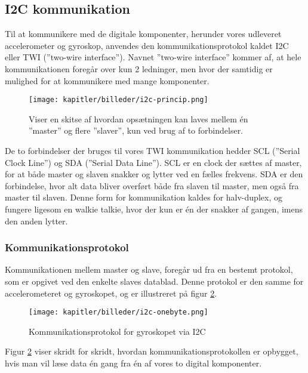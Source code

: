 \newpage
\subsection{I2C kommunikation}
Til at kommunikere med de digitale komponenter, herunder vores udleveret accelerometer og gyroskop, anvendes den kommunikationsprotokol kaldet I2C eller TWI (”two-wire interface”). Navnet ”two-wire interface” kommer af, at hele kommunikationen foregår over kun 2 ledninger, men hvor der samtidig er mulighed for at kommunikere med mange komponenter.

\begin{figure}[ht]
    \centering
    \texttt{[image: kapitler/billeder/i2c-princip.png]}
    \caption{Viser en skitse af hvordan opsætningen kan laves mellem
én ”master” og flere ”slaver”, kun ved brug af to forbindelser.}
    \label{fig:i2cprincip}
\end{figure}

De to forbindelser der bruges til vores TWI kommunikation hedder SCL (”Serial Clock Line”) og SDA (”Serial Data Line”). SCL er en clock der sættes af master, for at både master og slaven snakker og lytter ved en fælles frekvens. SDA er den forbindelse, hvor alt data bliver overført både fra slaven til master, men også fra master til slaven. Denne form for kommunikation kaldes for halv-duplex, og fungere ligesom en walkie talkie, hvor der kun er én der snakker af gangen, imens den anden lytter.

\subsubsection{Kommunikationsprotokol}

Kommunikationen mellem master og slave, foregår ud fra en bestemt protokol, som er opgivet ved den enkelte slaves datablad. Denne protokol er den samme for accelerometeret og gyroskopet, og er illustreret på figur \ref{fig:i2conebyte}. 

\begin{figure}[ht]
    \centering
    \texttt{[image: kapitler/billeder/i2c-onebyte.png]}
    \caption{Kommunikationsprotokol for gyroskopet via I2C}
    \label{fig:i2conebyte}
\end{figure}

Figur \ref{fig:i2conebyte} viser skridt for skridt, hvordan kommunikationsprotokollen er opbygget, hvis man vil læse data én gang fra én af vores to digital komponenter.

